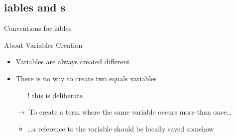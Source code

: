 \documentclass[handout]{beamer}
\begin{document}
\subsection{iables and s}

\begin{frame}[allowframebreaks]{Conventions for iables}
    \begin{block}{About Variables Creation}
        \begin{itemize}
            \item Variables are always created \alert{different}
            \item There is no way to create two equals variables
            \begin{itemize}
                \item[!] this is deliberate
            \end{itemize}
        \end{itemize}
    \end{block}

    \begin{itemize}
        \item[$\rightarrow$] To create a term where the same variable occurs more than once\ldots
        \begin{itemize}
            \item \ldots a reference to the variable should be locally saved somehow
        \end{itemize}
    \end{itemize}

    \framebreak


\end{frame}
\end{document}

